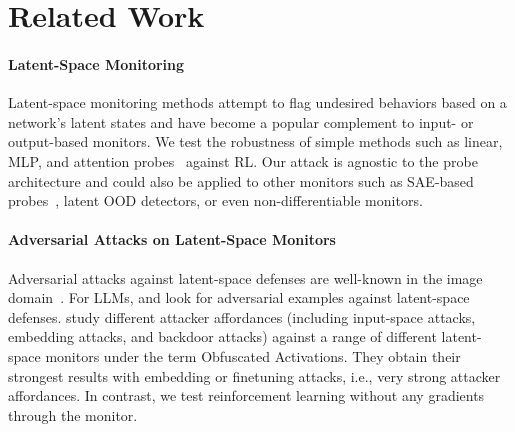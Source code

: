 \vspace{-4pt}
\section{Related Work}
\vspace{-4pt}
\paragraph{Latent-Space Monitoring} 
Latent-space monitoring methods attempt to flag undesired behaviors based on a network's latent states and have become a popular complement to input- or output-based monitors.
We test the robustness of simple methods such as linear, MLP, and attention probes~\citep{alain2016understanding,belinkov2022probing,zou2023representation,mallen2023eliciting,arditi2024refusal,ball2024understanding,macdiarmid2024sleeperagentprobes,bailey2024obfuscated} against RL. Our attack is agnostic to the probe architecture and could also be applied to other monitors such as SAE-based probes~\citep{bricken2024using,kantamneni2025sparseautoencodersuseful}, latent OOD detectors, or even non-differentiable monitors.
\vspace{-8pt}
\paragraph{Adversarial Attacks on Latent-Space Monitors}
Adversarial attacks against latent-space defenses are well-known in the image domain~\citep{carlini2017adversarial,athalye2018obfuscated,hosseini2019are,kaya2022generating}. For LLMs, \citet{schwinn2024revisiting} and \citet{li2024llm} look for adversarial examples against latent-space defenses.  study different attacker affordances (including input-space attacks, embedding attacks, and backdoor attacks) against a range of different latent-space monitors under the term Obfuscated Activations. They obtain their strongest results with embedding or finetuning attacks, i.e., very strong attacker affordances. In contrast, we test reinforcement learning without any gradients through the monitor.
\vspace{-8pt}
